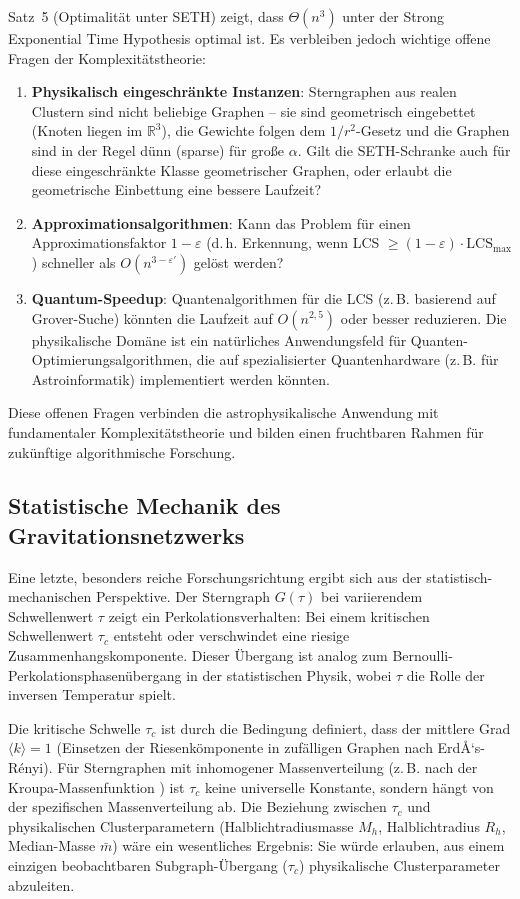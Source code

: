 ﻿\documentclass[a4paper,12pt]{report}
\theoremstyle{definition}
\begin{document}
Satz~5 (Optimalität unter SETH) zeigt, dass $\Theta(n^3)$ unter der Strong Exponential Time Hypothesis optimal ist. Es verbleiben jedoch wichtige offene Fragen der Komplexitätstheorie:

\begin{enumerate}
    \item \textbf{Physikalisch eingeschränkte Instanzen}: Sterngraphen aus realen Clustern sind nicht beliebige Graphen -- sie sind geometrisch eingebettet (Knoten liegen im $\mathbb{R}^3$), die Gewichte folgen dem $1/r^2$-Gesetz und die Graphen sind in der Regel dünn (sparse) für große $\alpha$. Gilt die SETH-Schranke auch für diese eingeschränkte Klasse geometrischer Graphen, oder erlaubt die geometrische Einbettung eine bessere Laufzeit?
    \item \textbf{Approximationsalgorithmen}: Kann das Problem für einen Approximationsfaktor $1 - \varepsilon$ (d.\,h. Erkennung, wenn LCS $\geq (1-\varepsilon) \cdot \mathrm{LCS}_\mathrm{max}$) schneller als $O(n^{3-\varepsilon'})$ gelöst werden?
    \item \textbf{Quantum-Speedup}: Quantenalgorithmen für die LCS (z.\,B. basierend auf Grover-Suche) könnten die Laufzeit auf $O(n^{2{,}5})$ oder besser reduzieren. Die physikalische Domäne ist ein natürliches Anwendungsfeld für Quanten-Optimierungsalgorithmen, die auf spezialisierter Quantenhardware (z.\,B. für Astroinformatik) implementiert werden könnten.
\end{enumerate}

Diese offenen Fragen verbinden die astrophysikalische Anwendung mit fundamentaler Komplexitätstheorie und bilden einen fruchtbaren Rahmen für zukünftige algorithmische Forschung.

\subsection{Statistische Mechanik des Gravitationsnetzwerks}

Eine letzte, besonders reiche Forschungsrichtung ergibt sich aus der statistisch-mechanischen Perspektive. Der Sterngraph $G(\tau)$ bei variierendem Schwellenwert $\tau$ zeigt ein Perkolationsverhalten: Bei einem kritischen Schwellenwert $\tau_c$ entsteht oder verschwindet eine riesige Zusammenhangskomponente. Dieser Übergang ist analog zum Bernoulli-Perkolationsphasen\-übergang in der statistischen Physik, wobei $\tau$ die Rolle der inversen Temperatur spielt.

Die kritische Schwelle $\tau_c$ ist durch die Bedingung definiert, dass der mittlere Grad $\langle k \rangle = 1$ (Einsetzen der Riesenkömponente in zufälligen Graphen nach ErdÅ‘s-Rényi). Für Sterngraphen mit inhomogener Massenverteilung (z.\,B. nach der Kroupa-Massenfunktion \cite{kroupa2001}) ist $\tau_c$ keine universelle Konstante, sondern hängt von der spezifischen Massenverteilung ab. Die Beziehung zwischen $\tau_c$ und physikalischen Clusterparametern (Halblichtradiusmasse $M_h$, Halblichtradius $R_h$, Median-Masse $\bar{m}$) wäre ein wesentliches Ergebnis: Sie würde erlauben, aus einem einzigen beobachtbaren Subgraph-Übergang ($\tau_c$) physikalische Clusterparameter abzuleiten.
\end{document}
